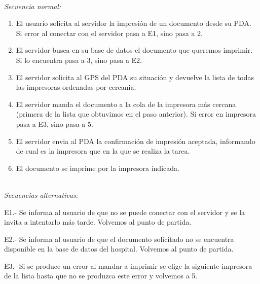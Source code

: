 \documentclass[12pt,a4paper,notitlepage,twoside]{report}
\begin{document}
\\
\emph{Secuencia normal:} 
\begin{enumerate}
\item El usuario solicita al servidor la impresi\'on de un documento desde su PDA. Si error al conectar con el servidor pasa a E1, sino pasa a 2.
\item El servidor busca en su base de datos el documento que queremos imprimir. Si lo encuentra pasa a 3, sino pasa a E2.
\item El servidor solicita al GPS del PDA su situaci\'on y devuelve la lista de todas las impresoras ordenadas por cercania.
\item El servidor manda el documento a la cola de la impresora m\'as cercana (primera de la lista que obtuvimos en el paso anterior). Si error en impresora pasa a E3, sino pasa a 5.
\item El servidor envia al PDA la confirmaci\'on de impresi\'on aceptada, informando de cual es la impresora que en la que se realiza la tarea.
\item El documento se imprime por la impresora indicada.
\end{enumerate}
\\
\emph{Secuencias alternativas:}
\begin{description}
\item E1.- Se informa al usuario de que no se puede conectar con el servidor y se la invita a intentarlo m\'as tarde. Volvemos al punto de partida.
\item E2.- Se informa al usuario de que el documento solicitado no se encuentra disponible en la base de datos del hospital. Volvemos al punto de partida.
\item E3.- Si se produce un error al mandar a imprimir se elige la siguiente impresora de la lista hasta que no se produzca este error y volvemos a 5.
\end{description}
\end{document}
